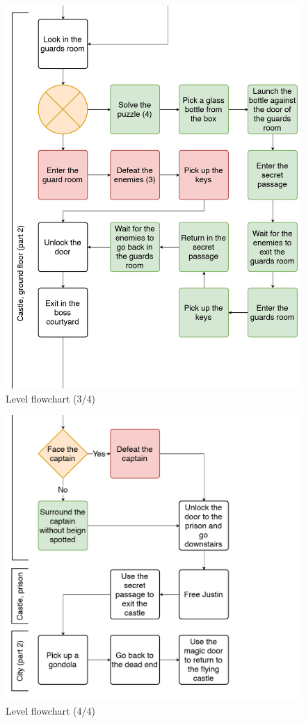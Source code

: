 \begin{figure}[H]
  \centering
  \includegraphics[width=15cm]{Images/Diagrams/dynamia_3}
  \caption{Level flowchart (3/4)}
\end{figure}

\begin{figure}[H]
  \centering
  \includegraphics[width=15cm]{Images/Diagrams/dynamia_4}
  \caption{Level flowchart (4/4)}
\end{figure}
\hspace{0pt} \\ %
